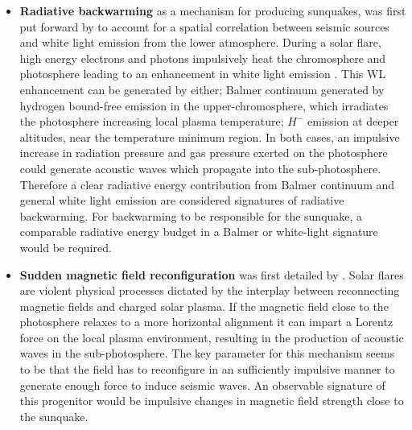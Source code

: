 \begin{itemize}
\item \textbf{Radiative backwarming} as a mechanism for producing sunquakes, was first put forward by \cite{2005ApJ...630.1168D} to account for a spatial correlation between seismic sources and white light emission from the lower atmosphere. During a solar flare, high energy electrons and photons impulsively heat the chromosphere and photosphere leading to an enhancement in white light emission \citep{1989SoPh..124..303M}. This WL enhancement can be generated by either; Balmer continuum generated by hydrogen bound-free emission in the upper-chromosphere, which irradiates the photosphere increasing local plasma temperature; $H^{-}$ emission at deeper altitudes, near the temperature minimum region. In both cases, an impulsive increase in radiation pressure and gas pressure exerted on the photosphere could generate acoustic waves which propagate into the sub-photosphere. Therefore a clear radiative energy contribution from Balmer continuum and general white light emission are considered signatures of radiative backwarming. For backwarming to be responsible for the sunquake, a comparable radiative energy budget in a Balmer or white-light signature would be required.\\

\item \textbf{Sudden magnetic field reconfiguration} was first detailed by \cite{2008ASPC..383..221H}. Solar flares are violent physical processes dictated by the interplay between reconnecting magnetic fields and charged solar plasma.
If the magnetic field close to the photosphere relaxes to a more horizontal alignment it can impart a Lorentz force on the local plasma environment, resulting in the production of acoustic waves in the sub-photosphere. The key parameter for this mechanism seems to be that the field has to reconfigure in an sufficiently impulsive manner to generate enough force to induce seismic waves. An observable signature of this progenitor would be impulsive changes in magnetic field strength close to the sunquake. \\


\end{itemize}
